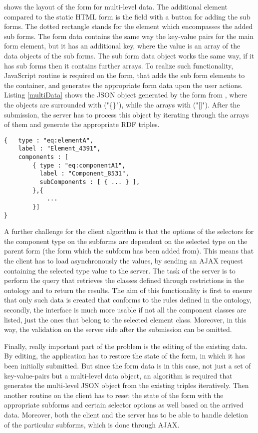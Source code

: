  shows the layout of the form for multi-level data. The additional element compared to the static HTML form is the field with a button for adding the sub forms. The dotted rectangle stands for the element which encompasses the added sub forms. The form data contains the same way the key-value pairs for the main form element, but it has an additional key, where the value is an array of the data objects of the sub forms. The sub form data object works the same way, if it has sub forms then it contains further arrays. To realize such functionality, JavaScript routine is required on the form, that adds the sub form elements to the container, and generates the appropriate form data upon the user actions. Listing \ref{multiData} shows the JSON object generated by the form from , where the objects are surrounded with ("\{\}"), while the arrays with ("[]"). After the submission, the server has to process this object by iterating through the arrays of them and generate the appropriate RDF triples.

\begin{lstlisting}[basicstyle=\footnotesize, frame=single, caption={Multi level form data in JSON}, label=multiData, captionpos=b, belowskip=1em, aboveskip=2em]
{	type : "eq:elementA",
	label : "Element_4391",
	components : [
		{ type : "eq:componentA1",
		  label : "Component_8531",	
		  subComponents : [ { ... } ],
		},{ 
			... 
		}]
}
\end{lstlisting}

A further challenge for the client algorithm is that the options of the selectors for the component type on the subforms are dependent on the selected type on the parent form (the form which the subform has been added from). This means that the client has to load asynchronously the values, by sending an AJAX request containing the selected type value to the server. The task of the server is to perform the query that retrieves the classes defined through restrictions in the ontology and to return the results. The aim of this functionality is first to ensure that only such data is created that conforms to the rules defined in the ontology, secondly, the interface is much more usable if not all the component classes are listed, just the ones that belong to the selected element class. Moreover, in this way, the validation on the server side after the submission can be omitted.

Finally, really important part of the problem is the editing of the existing data. By editing, the application has to restore the state of the form, in which it has been initially submitted. But since the form data is in this case, not just a set of key-value-pairs but a multi-level data object, an algorithm is required that generates the multi-level JSON object from the existing triples iteratively. Then another routine on the client has to reset the state of the form with the appropriate subforms and certain selector options as well based on the arrived data. Moreover, both the client and the server has to be able to handle deletion of the particular subforms, which is done through AJAX.

